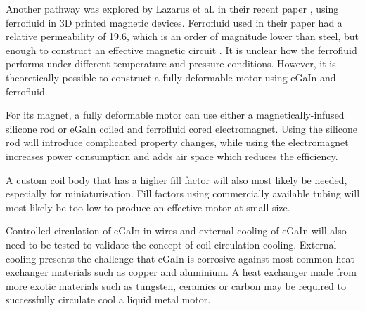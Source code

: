 \documentclass[a4paper,12pt]{article}
\begin{document}
Another pathway was explored by Lazarus et al. in their recent paper \cite{lazarusCreating3DPrinted2019}, using ferrofluid in 3D printed magnetic devices. Ferrofluid used in their paper had a relative permeability of 19.6, which is an order of magnitude lower than steel, but enough to construct an effective magnetic circuit \cite{ferrotecFerrotecFerrofluidInnovating2019}. It is unclear how the ferrofluid performs under different temperature and pressure conditions. However, it is theoretically possible to construct a fully deformable motor using eGaIn and ferrofluid.

For its magnet, a fully deformable motor can use either a magnetically-infused silicone rod or eGaIn coiled and ferrofluid cored electromagnet. Using the silicone rod will introduce complicated property changes, while using the electromagnet increases power consumption and adds air space which reduces the efficiency.

A custom coil body that has a higher fill factor will also most likely be needed, especially for miniaturisation. Fill factors using commercially available tubing will most likely be too low to produce an effective motor at small size.

Controlled circulation of eGaIn in wires and external cooling of eGaIn will also need to be tested to validate the concept of coil circulation cooling. External cooling presents the challenge that eGaIn is corrosive against most common heat exchanger materials such as copper and aluminium. A heat exchanger made from more exotic materials such as tungsten, ceramics or carbon may be required to successfully circulate cool a liquid metal motor.

\newpage

\printbibliography
\end{document}
